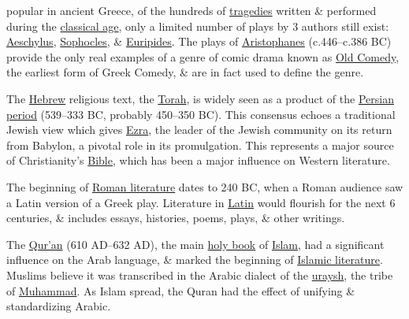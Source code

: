 \documentclass[oneside]{book}
\numberwithin{equation}{section}
\begin{document}
popular in ancient Greece, of the hundreds of \href{https://en.wikipedia.org/wiki/Tragedy}{tragedies} written \& performed during the \href{https://en.wikipedia.org/wiki/Classical_age}{classical age}, only a limited number of plays by 3 authors still exist: \href{https://en.wikipedia.org/wiki/Aeschylus}{Aeschylus}, \href{https://en.wikipedia.org/wiki/Sophocles}{Sophocles}, \& \href{https://en.wikipedia.org/wiki/Euripides}{Euripides}. The plays of \href{https://en.wikipedia.org/wiki/Aristophanes}{Aristophanes} (c.446--c.386 BC) provide the only real examples of a genre of comic drama known as \href{https://en.wikipedia.org/wiki/Ancient_Greek_comedy}{Old Comedy}, the earliest form of Greek Comedy, \& are in fact used to define the genre.

The \href{https://en.wikipedia.org/wiki/Hebrew}{Hebrew} religious text, the \href{https://en.wikipedia.org/wiki/Torah}{Torah}, is widely seen as a product of the \href{https://en.wikipedia.org/wiki/Persian_period}{Persian period} (539--333 BC, probably 450--350 BC). This consensus echoes a traditional Jewish view which gives \href{https://en.wikipedia.org/wiki/Ezra}{Ezra}, the leader of the Jewish community on its return from Babylon, a pivotal role in its promulgation. This represents a major source of Christianity's \href{https://en.wikipedia.org/wiki/Bible}{Bible}, which has been a major influence on Western literature.

The beginning of \href{https://en.wikipedia.org/wiki/Roman_literature}{Roman literature} dates to 240 BC, when a Roman audience saw a Latin version of a Greek play. Literature in \href{https://en.wikipedia.org/wiki/Latin}{Latin} would flourish for the next 6 centuries, \& includes essays, histories, poems, plays, \& other writings.

The \href{https://en.wikipedia.org/wiki/Qur%27an}{Qur'an} (610 AD--632 AD), the main \href{https://en.wikipedia.org/wiki/Religious_text}{holy book} of \href{https://en.wikipedia.org/wiki/Islam}{Islam}, had a significant influence on the Arab language, \& marked the beginning of \href{https://en.wikipedia.org/wiki/Islamic_literature}{Islamic literature}. Muslims believe it was transcribed in the Arabic dialect of the \href{https://en.wikipedia.org/wiki/Quraysh}{uraysh}, the tribe of \href{https://en.wikipedia.org/wiki/Muhammad}{Muhammad}. As Islam spread, the Quran had the effect of unifying \& standardizing Arabic.
\end{document}
